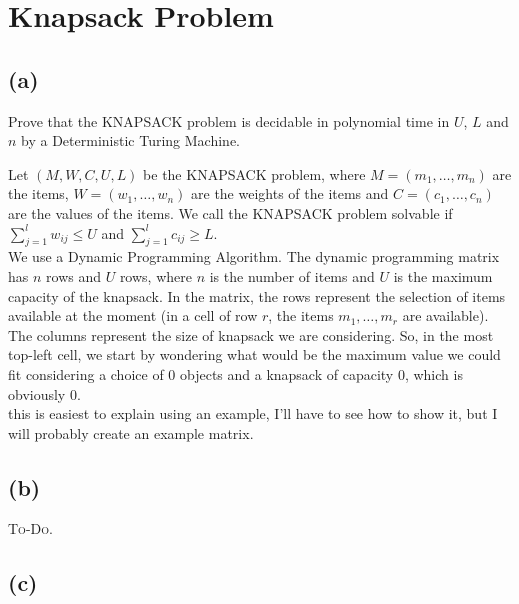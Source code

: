 

\setcounter{section}{1}


\section{Knapsack Problem}

\subsection{(a)}

Prove that the \textsc{KNAPSACK} problem is decidable in polynomial time in $U$, $L$ and $n$ by a Deterministic Turing Machine.

Let $(M,W,C,U,L)$ be the \textsc{KNAPSACK} problem, where $M = (m_{1},\ldots,m_{n})$ are the items, $W = (w_{1},\ldots,w_{n})$ are the weights of the items and $C=(c_{1},\ldots,c_{n})$ are the values of the items. We call the \textsc{KNAPSACK} problem solvable if $\sum_{j=1}^{l}w_{ij} \leq U$ and $\sum_{j=1}^{l}c_{ij}\geq L$.\\
We use a Dynamic Programming Algorithm. The dynamic programming matrix has $n$ rows and $U$ rows, where $n$ is the number of items and $U$ is the maximum capacity of the knapsack. In the matrix, the rows represent the selection of items available at the moment (in a cell of row $r$, the items $m_{1},\ldots,m_{r}$ are available). The columns represent the size of knapsack we are considering. So, in the most top-left cell, we start by wondering what would be the maximum value we could fit considering a choice of $0$ objects and a knapsack of capacity $0$, which is obviously $0$.\\
{\color{red} this is easiest to explain using an example, I'll have to see how to show it, but I will probably create an example matrix.}

\subsection{(b)}

\textsc{To-Do.}

\subsection{(c)}

